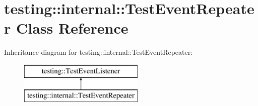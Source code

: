 \hypertarget{classtesting_1_1internal_1_1_test_event_repeater}{}\section{testing\+:\+:internal\+:\+:Test\+Event\+Repeater Class Reference}
\label{classtesting_1_1internal_1_1_test_event_repeater}
Inheritance diagram for testing\+:\+:internal\+:\+:Test\+Event\+Repeater\+:\begin{figure}[H]
\begin{center}
\leavevmode
\includegraphics[height=2.000000cm]{classtesting_1_1internal_1_1_test_event_repeater}
\end{center}
\end{figure}
